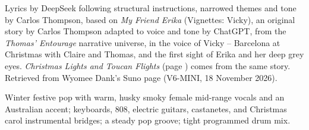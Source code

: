 
\label{sec:deep-grey-eyes}
\begin{notes}
Lyrics by DeepSeek following structural instructions, narrowed themes and tone by Carlos Thompson, based on \emph{My Friend Erika} (Vignettes: Vicky), an original story by Carlos Thompson adapted to voice and tone by ChatGPT, from the \emph{Thomas' Entourage} narrative universe, in the voice of Vicky -- Barcelona at Christmas with Claire and Thomas, and the first sight of Erika and her deep grey eyes. \emph{Christmas Lights and Toucan Flights} (page \pageref{sec:christmas-lights-and-toucan-flights}) comes from the same story. Retrieved from Wyomee Dank's Suno page (V6-MINI, 18 November 2026).
\end{notes}
\begin{style}
Winter festive pop with warm, husky smoky female mid-range vocals and an Australian accent; keyboards, 808, electric guitars, castanetes, and Christmas carol instrumental bridges; a steady pop groove; tight programmed drum mix.
\end{style}
